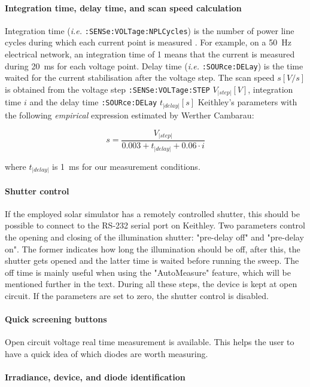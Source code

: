 		\paragraph{Integration time, delay time, and scan speed calculation}
		Integration time (\textsl{i.e.} \texttt{:SENSe:VOLTage:NPLCycles}) is the number of power line cycles during which each current point is measured \cite{KeithleyInstruments2011}.
		For example, on a \SI{50}{\Hz} electrical network, an integration time of 1 means that the current is measured during \SI{20}{\ms} for each voltage point.
		Delay time (\textsl{i.e.} \texttt{:SOURce:DELay}) is the time waited for the current stabilisation after the voltage step.
The scan speed $s[V/s]$ is obtained from the voltage step \texttt{:SENSe:VOLTage:STEP} $V_|step|[V]$, integration time $i$ and the delay time \texttt{:SOURce:DELay} $t_|delay|[s]$ Keithley's parameters with the following \textit{empirical} expression estimated by Werther Cambarau:

\begin{equation}
s = \frac{V_|step|}{0.003 + t_|delay| + 0.06 \cdot i}
\end{equation}

where $t_|delay|$ is \SI{1}{\ms} for our measurement conditions.

\paragraph{Shutter control}
If the employed solar simulator has a remotely controlled shutter, this should be possible to connect to the RS-232 serial port on Keithley.
Two parameters control the opening and closing of the illumination shutter: "pre-delay off" and "pre-delay on".
The former indicates how long the illumination should be off, after this, the shutter gets opened and the latter time is waited before running the sweep.
The off time is mainly useful when using the "AutoMeasure" feature, which will be mentioned further in the text.
During all these steps, the device is kept at open circuit.
If the parameters are set to zero, the shutter control is disabled.

\paragraph{Quick screening buttons}
Open circuit voltage real time measurement is available.
This helps the user to have a quick idea of which diodes are worth measuring.

\paragraph{Irradiance, device, and diode identification}

